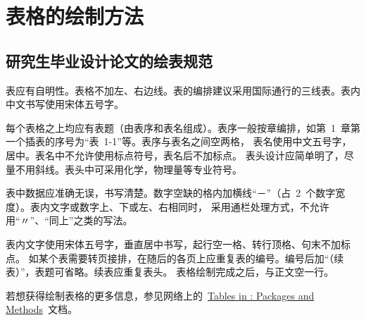 
\chapter{表格的绘制方法}
\section{研究生毕业设计论文的绘表规范}

表应有自明性。表格不加左、右边线。表的编排建议采用国际通行的三线表。表内中文书写使用宋体五号字。

每个表格之上均应有表题（由表序和表名组成）。表序一般按章编排，如第~1~章第一个插表的序号为“表~1-1”等。表序与表名之间空两格，
表名使用中文五号字，居中。表名中不允许使用标点符号，表名后不加标点。
表头设计应简单明了，尽量不用斜线。表头中可采用化学，物理量等专业符号。


表中数据应准确无误，书写清楚。数字空缺的格内加横线“－”（占~2~个数字宽度）。表内文字或数字上、下或左、右相同时，
采用通栏处理方式，不允许用“〃”、“同上”之类的写法。

表内文字使用宋体五号字，垂直居中书写，起行空一格、转行顶格、句末不加标点。
如某个表需要转页接排，在随后的各页上应重复表的编号。编号后加“（续表）”，表题可省略。续表应重复表头。
表格绘制完成之后，与正文空一行。

若想获得绘制表格的更多信息，参见网络上的~\href{http://www.tug.org/pracjourn/2007-1/mori/}{Tables in \LaTeXe: Packages and Methods}~文档。

